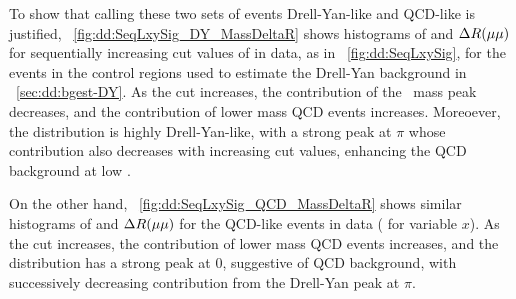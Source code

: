 To show that calling these two sets of events \mbox{Drell-Yan}-like and QCD-like is justified, \Fig~\ref{fig:dd:SeqLxySig_DY_MassDeltaR} shows histograms of \mMuMu and $\Delta R(\mathrm{\mu}\mathrm{\mu})$ for sequentially increasing cut values of \LxySig in data, as in \Fig~\ref{fig:dd:SeqLxySig}, for the events in the control regions used to estimate the Drell-Yan background in \Sec~\ref{sec:dd:bgest-DY}.
As the cut increases, the contribution of the \PZ\ mass peak decreases, and the contribution of lower mass QCD events increases.
Moreoever, the \deltaR distribution is highly \mbox{Drell-Yan}-like, with a strong peak at $\pi$ whose contribution also decreases with increasing \LxySig cut values, enhancing the QCD background at low \deltaR.

On the other hand, \Fig~\ref{fig:dd:SeqLxySig_QCD_MassDeltaR} shows similar histograms of \mMuMu and $\Delta R(\mathrm{\mu}\mathrm{\mu})$ for the QCD-like events in data (\ie {} for variable $x$).
As the cut increases, the contribution of lower mass QCD events increases, and the \deltaR distribution has a strong peak at 0, suggestive of QCD background, with successively decreasing contribution from the Drell-Yan peak at $\pi$.

